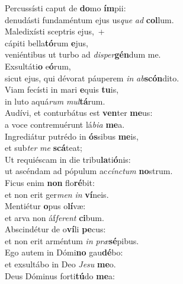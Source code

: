 \evenverse Percussísti caput de \textbf{do}mo \textbf{ím}pii:~\*\\
\evenverse denudásti fundaméntum ejus us\textit{que} \textit{ad} \textbf{col}lum.\\
\oddverse Maledixísti sceptris ejus,~+\\
\oddverse  cápiti bella\textbf{tó}rum \textbf{e}jus,~\*\\
\oddverse veniéntibus ut turbo ad \textit{di}\textit{sper}\textbf{gén}dum me.\\
\evenverse Exsultáti\textbf{o} e\textbf{ó}rum,~\*\\
\evenverse sicut ejus, qui dévorat páuperem \textit{in} \textit{ab}\textbf{scón}dito.\\
\oddverse Viam fecísti in mari \textbf{e}quis \textbf{tu}is,~\*\\
\oddverse in luto aquá\textit{rum} \textit{mul}\textbf{tá}rum.\\
\evenverse Audívi, et conturbátus est \textbf{ven}ter \textbf{me}us:~\*\\
\evenverse a voce contremuérunt lá\textit{bi}\textit{a} \textbf{me}a.\\
\oddverse Ingrediátur putrédo in \textbf{ós}sibus \textbf{me}is,~\*\\
\oddverse et sub\textit{ter} \textit{me} \textbf{scá}teat;\\
\evenverse Ut requiéscam in die tribu\textbf{la}ti\textbf{ó}nis:~\*\\
\evenverse ut ascéndam ad pópulum ac\textit{cín}\textit{ctum} \textbf{no}strum.\\
\oddverse Ficus enim \textbf{non} flo\textbf{ré}bit:~\*\\
\oddverse et non erit ger\textit{men} \textit{in} \textbf{ví}neis.\\
\evenverse Mentiétur \textbf{o}pus o\textbf{lí}væ:~\*\\
\evenverse et arva non áf\textit{fe}\textit{rent} \textbf{ci}bum.\\
\oddverse Abscindétur de o\textbf{ví}li \textbf{pe}cus:~\*\\
\oddverse et non erit arméntum \textit{in} \textit{præ}\textbf{sé}pibus.\\
\evenverse Ego autem in Dómi\textbf{no} gau\textbf{dé}bo:~\*\\
\evenverse et exsultábo in Deo \textit{Je}\textit{su} \textbf{me}o.\\
\oddverse Deus Dóminus forti\textbf{tú}do \textbf{me}a:~\*\\
